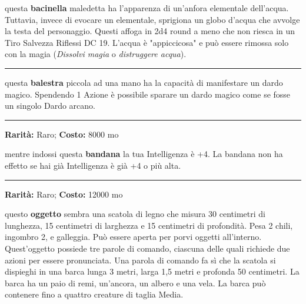 \begin{multicols}{2}
questa \textbf{bacinella} maledetta ha l'apparenza di un'anfora elementale dell'acqua. Tuttavia, invece di evocare un elementale, sprigiona un globo d'acqua che avvolge la testa del personaggio. Questi affoga in 2d4 round a meno che non riesca in un Tiro Salvezza Riflessi DC 19. L'acqua è "appiccicosa" e può essere rimossa solo con la magia (\emph{Dissolvi magia} o \emph{distruggere acqua}).

\smallskip\noindent\rule{\linewidth}{2pt}  \hypertarget{BalestradeiDardiArcani}{}\medskip{}\noindent\label{BalestradeiDardiArcani}

questa \textbf{balestra} piccola ad una mano ha la capacità di manifestare un dardo magico.
Spendendo 1 Azione è possibile sparare un dardo magico come se fosse un singolo Dardo arcano.

\smallskip\noindent\rule{\linewidth}{2pt}  \hypertarget{Bandanadell'Intelligenza}{}\medskip{}\noindent\label{Bandanadell'Intelligenza}

\textbf{Rarità:} Raro; \textbf{Costo:} 8000 mo

mentre indossi questa \textbf{bandana} la tua Intelligenza è +4. La bandana non ha effetto se hai già Intelligenza è già +4 o più alta.

\smallskip\noindent\rule{\linewidth}{2pt}  \hypertarget{BarcaPieghevole}{}\medskip{}\noindent\label{BarcaPieghevole}

\textbf{Rarità:} Raro; \textbf{Costo:} 12000 mo

questo \textbf{oggetto} sembra una scatola di legno che misura 30 centimetri di lunghezza, 15 centimetri di larghezza e 15 centimetri di profondità. Pesa 2 chili, ingombro 2, e galleggia. Può essere aperta per porvi oggetti all'interno. Quest'oggetto possiede tre parole di comando, ciascuna delle quali richiede due azioni per essere pronunciata. Una parola di comando fa sì che la scatola si dispieghi in una barca lunga 3 metri, larga 1,5 metri e profonda 50 centimetri. La barca ha un paio di remi, un'ancora, un albero e una vela. La barca può contenere fino a quattro creature di taglia Media.


\end{multicols}

